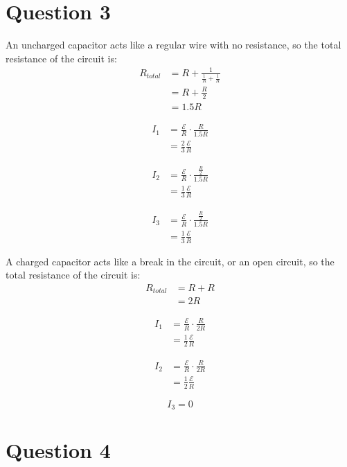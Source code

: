 \documentclass[11pt]{article}
\begin{document}
\newpage

\section{Question 3}
\label{sec:org5eb2077}
An uncharged capacitor acts like a regular wire with no resistance, so the total resistance of the circuit is:
\begin{align*}
R_{total} &= R + \frac{1}{\frac{1}{R} + \frac{1}{R}} \\
&= R + \frac{R}{2} \\
&= 1.5R
\end{align*}

\begin{align*}
I_1 &= \frac{\mathcal{E}}{R} \cdot \frac{R}{1.5R} \\
&= \frac{2}{3} \frac{\mathcal{E}}{R}
\end{align*}

\begin{align*}
I_2 &= \frac{\mathcal{E}}{R} \cdot \frac{\frac{R}{2}}{1.5R} \\
&= \frac{1}{3} \frac{\mathcal{E}}{R}
\end{align*}

\begin{align*}
I_3 &= \frac{\mathcal{E}}{R} \cdot \frac{\frac{R}{2}}{1.5R} \\
&= \frac{1}{3} \frac{\mathcal{E}}{R}
\end{align*}

\newpage

A charged capacitor acts like a break in the circuit, or an open circuit, so the total resistance of the circuit is:
\begin{align*}
R_{total} &= R + R \\
&= 2R
\end{align*}

\begin{align*}
I_1 &= \frac{\mathcal{E}}{R} \cdot \frac{R}{2R} \\
&= \frac{1}{2} \frac{\mathcal{E}}{R}
\end{align*}

\begin{align*}
I_2 &= \frac{\mathcal{E}}{R} \cdot \frac{R}{2R} \\
&= \frac{1}{2} \frac{\mathcal{E}}{R}
\end{align*}

\[I_3 = 0\]


\section{Question 4}
\label{sec:org5310d47}
\end{document}
